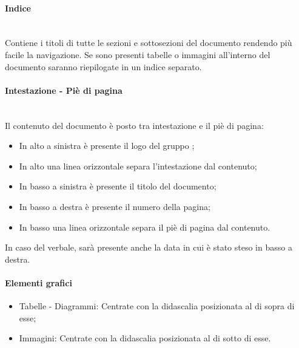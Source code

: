 \paragraph{Indice}\mbox{} \\
Contiene i titoli di tutte le sezioni e sottosezioni del documento rendendo più facile la navigazione.
Se sono presenti tabelle o immagini all'interno del documento saranno riepilogate in un indice separato.

\paragraph{Intestazione - Piè di pagina} \mbox{} \\
Il contenuto del documento è posto tra intestazione e il piè di pagina:

\begin{itemize}
\item In alto a sinistra è presente il logo del gruppo \Gruppo;
\item In alto una linea orizzontale separa l’intestazione dal contenuto;
\item In basso a sinistra è presente il titolo del documento;
\item In basso a destra è presente il numero della pagina;
\item In basso una linea orizzontale separa il piè di pagina dal contenuto.
\end{itemize}
In caso del verbale, sarà presente anche la data in cui è stato steso in basso a destra.

\paragraph{Elementi grafici}\mbox{}
\begin{itemize}
\item Tabelle - Diagrammi: Centrate con la didascalia posizionata al di sopra di esse;
\item Immagini: Centrate con la didascalia posizionata al di sotto di esse.
\end{itemize}

